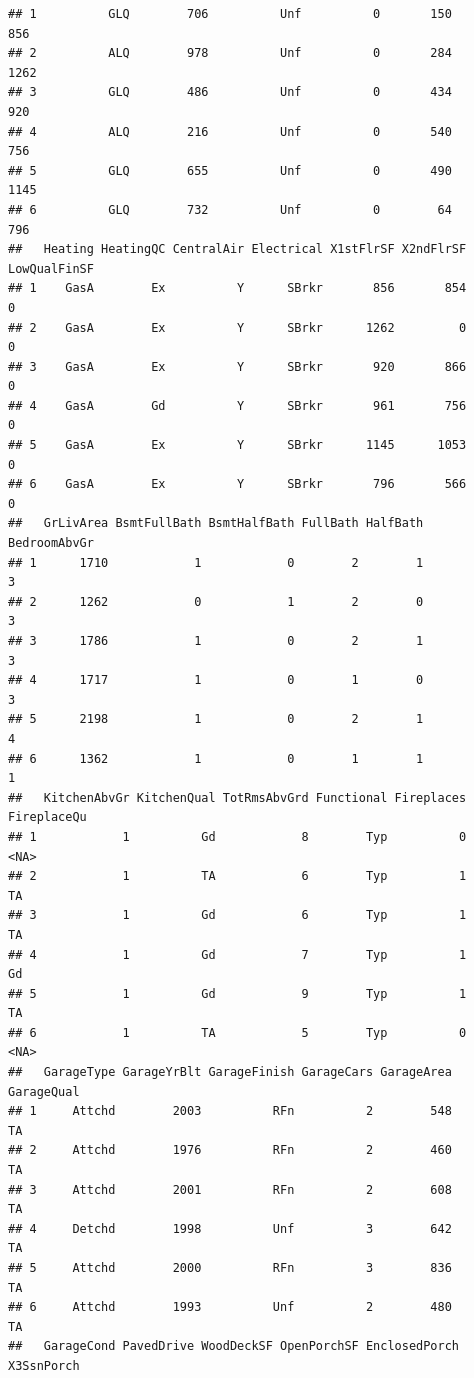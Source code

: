 \documentclass[]{article}
\begin{document}
\begin{verbatim}
## 1          GLQ        706          Unf          0       150         856
## 2          ALQ        978          Unf          0       284        1262
## 3          GLQ        486          Unf          0       434         920
## 4          ALQ        216          Unf          0       540         756
## 5          GLQ        655          Unf          0       490        1145
## 6          GLQ        732          Unf          0        64         796
##   Heating HeatingQC CentralAir Electrical X1stFlrSF X2ndFlrSF LowQualFinSF
## 1    GasA        Ex          Y      SBrkr       856       854            0
## 2    GasA        Ex          Y      SBrkr      1262         0            0
## 3    GasA        Ex          Y      SBrkr       920       866            0
## 4    GasA        Gd          Y      SBrkr       961       756            0
## 5    GasA        Ex          Y      SBrkr      1145      1053            0
## 6    GasA        Ex          Y      SBrkr       796       566            0
##   GrLivArea BsmtFullBath BsmtHalfBath FullBath HalfBath BedroomAbvGr
## 1      1710            1            0        2        1            3
## 2      1262            0            1        2        0            3
## 3      1786            1            0        2        1            3
## 4      1717            1            0        1        0            3
## 5      2198            1            0        2        1            4
## 6      1362            1            0        1        1            1
##   KitchenAbvGr KitchenQual TotRmsAbvGrd Functional Fireplaces FireplaceQu
## 1            1          Gd            8        Typ          0        <NA>
## 2            1          TA            6        Typ          1          TA
## 3            1          Gd            6        Typ          1          TA
## 4            1          Gd            7        Typ          1          Gd
## 5            1          Gd            9        Typ          1          TA
## 6            1          TA            5        Typ          0        <NA>
##   GarageType GarageYrBlt GarageFinish GarageCars GarageArea GarageQual
## 1     Attchd        2003          RFn          2        548         TA
## 2     Attchd        1976          RFn          2        460         TA
## 3     Attchd        2001          RFn          2        608         TA
## 4     Detchd        1998          Unf          3        642         TA
## 5     Attchd        2000          RFn          3        836         TA
## 6     Attchd        1993          Unf          2        480         TA
##   GarageCond PavedDrive WoodDeckSF OpenPorchSF EnclosedPorch X3SsnPorch

\end{verbatim}
\end{document}
